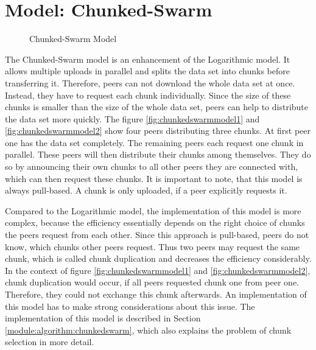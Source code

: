 \section{Model: Chunked-Swarm}
\label{theory:model:chunkedswarm}

\begin{figure}[ht]
	\begin{center}
	 	\hspace{0.2\textwidth}

		\caption{Chunked-Swarm Model}
	\end{center}
\end{figure}


The Chunked-Swarm model is an enhancement of the Logarithmic model. It allows multiple uploads in parallel and splits the data set into chunks before transferring it. Therefore, peers can not download the whole data set at once. Instead, they have to request each chunk individually. Since the size of these chunks is smaller than the size of the whole data set, peers can help to distribute the data set more quickly. The figure \ref{fig:chunkedswarmmodel1} and \ref{fig:chunkedswarmmodel2} show four peers distributing three chunks. At first peer one has the data set completely. The remaining peers each request one chunk in parallel. These peers will then distribute their chunks among themselves. They do so by announcing their own chunks to all other peers they are connected with, which can then request these chunks. It is important to note, that this model is always pull-based. A chunk is only uploaded, if a peer explicitly requests it.

Compared to the Logarithmic model, the implementation of this model is more complex, because the efficiency essentially depends on the right choice of chunks the peers request from each other. Since this approach is pull-based, peers do not know, which chunks other peers request. Thus two peers may request the same chunk, which is called chunk duplication and decreases the efficiency considerably. In the context of figure \ref{fig:chunkedswarmmodel1} and \ref{fig:chunkedswarmmodel2}, chunk duplication would occur, if all peers requested chunk one from peer one. Therefore, they could not exchange this chunk afterwards. An implementation of this model has to make strong considerations about this issue. The implementation of this model is described in Section \ref{module:algorithm:chunkedswarm}, which also explains the problem of chunk selection in more detail. 

